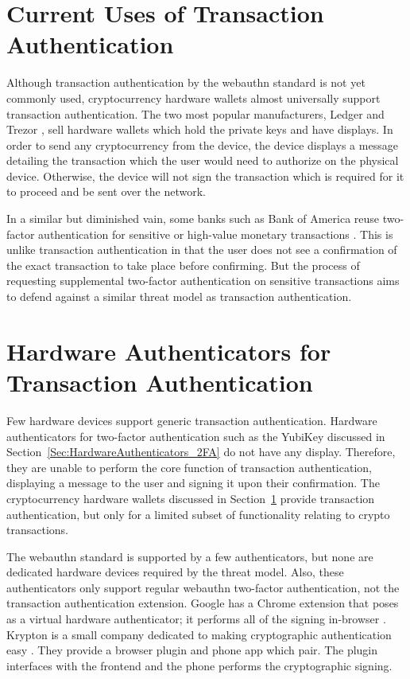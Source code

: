 \section{Current Uses of Transaction Authentication}\label{Sec:CurrentUses_txAuthn}

Although transaction authentication by the webauthn standard is not yet commonly used, cryptocurrency hardware wallets almost universally support transaction authentication. The two most popular manufacturers, Ledger \cite{https://www.ledger.com/} and Trezor \cite{https://trezor.io/}, sell hardware wallets which hold the private keys and have displays. In order to send any cryptocurrency from the device, the device displays a message detailing the transaction which the user would need to authorize on the physical device. Otherwise, the device will not sign the transaction which is required for it to proceed and be sent over the network.

In a similar but diminished vain, some banks such as Bank of America reuse two-factor authentication for sensitive or high-value monetary transactions \cite{https://www.eff.org/deeplinks/2016/12/how-enable-two-factor-authentication-bank-america}. This is unlike transaction authentication in that the user does not see a confirmation of the exact transaction to take place before confirming. But the process of requesting supplemental two-factor authentication on sensitive transactions aims to defend against a similar threat model as transaction authentication.

\section{Hardware Authenticators for \newline Transaction Authentication}

Few hardware devices support generic transaction authentication. Hardware authenticators for two-factor authentication such as the YubiKey discussed in Section~\ref{Sec:HardwareAuthenticators_2FA} do not have any display. Therefore, they are unable to perform the core function of transaction authentication, displaying a message to the user and signing it upon their confirmation. The cryptocurrency hardware wallets discussed in Section~\ref{Sec:CurrentUses_txAuthn} provide transaction authentication, but only for a limited subset of functionality relating to crypto transactions.  

The webauthn standard is supported by a few authenticators, but none are dedicated hardware devices required by the threat model. Also, these authenticators only support regular webauthn two-factor authentication, not the transaction authentication extension. Google has a Chrome extension that poses as a virtual hardware authenticator; it performs all of the signing in-browser \cite{https://github.com/google/virtual-authenticators-tab}. Krypton is a small company dedicated to making cryptographic authentication easy \cite{https://krypt.co/}. They provide a browser plugin and phone app which pair. The plugin interfaces with the frontend and the phone performs the cryptographic signing. 

